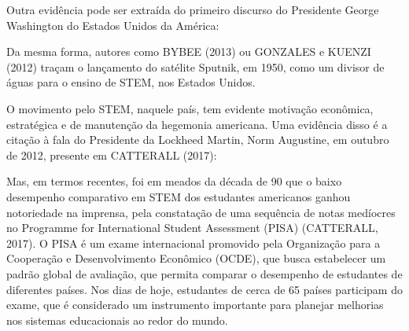 Outra evidência pode ser extraída do primeiro discurso do Presidente George Washington do Estados Unidos da América:


\noindent\begin{center}\mbox{\centering{}}\end{center}


Da mesma forma, autores como  BYBEE (2013)  ou  GONZALES e KUENZI (2012) traçam o lançamento do satélite Sputnik, em 1950, como um divisor de águas para o ensino de STEM, nos Estados Unidos.

O movimento pelo STEM, naquele país, tem evidente motivação econômica, estratégica e de manutenção da hegemonia americana. Uma evidência disso é a citação à fala do Presidente da Lockheed Martin, Norm Augustine, em outubro de 2012, presente em  CATTERALL (2017):


\noindent\begin{center}\mbox{\centering{}}\end{center}


Mas, em termos recentes, foi em meados da década de 90 que o baixo desempenho comparativo em STEM dos estudantes americanos ganhou notoriedade na imprensa, pela constatação de uma sequência de notas medíocres no Programme for International Student Assessment (PISA)  (CATTERALL, 2017). O PISA é um exame internacional promovido pela Organização para a Cooperação e Desenvolvimento Econômico (OCDE), que busca estabelecer um padrão global de avaliação, que permita comparar o desempenho de estudantes de diferentes países. Nos dias de hoje, estudantes de cerca de 65 países participam do exame, que é considerado um instrumento importante para planejar melhorias nos sistemas educacionais ao redor do mundo.

